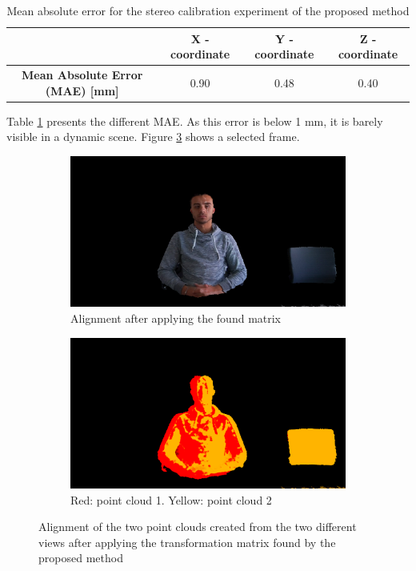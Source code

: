\begin{table}[H]
\begin{tabular}{c|c|c|c}
 & \textbf{X - coordinate} & \textbf{Y - coordinate} & \textbf{Z - coordinate} \\ \hline
\textbf{Mean Absolute Error (MAE) {[}mm{]}} & 0.90 & 0.48 & 0.40
\end{tabular}
\caption{Mean absolute error for the stereo calibration experiment of the proposed method}
\label{tab:mae_proposed_method}
\end{table}

Table \ref{tab:mae_proposed_method} presents the different MAE. As this error is below 1 mm, it is barely visible in a dynamic scene. Figure \ref{figure:proposed_method_alignment} shows a selected frame.


\begin{figure}[H]
\centering
  \begin{subfigure}[b]{0.48 \textwidth}
    \includegraphics[width=\textwidth]{images/registration/proposed_method_RGB.png}
    \caption{Alignment after applying the found matrix}
    \label{figure:stereo_RGB}
  \end{subfigure}
  \hfill
  \begin{subfigure}[b]{0.48\textwidth}
    \includegraphics[width=\textwidth]{images/registration/proposed_method_colour.png}
    \caption{Red: point cloud 1. Yellow: point cloud 2}
    \label{figure:stereo_colored}
  \end{subfigure}
  \caption{Alignment of the two point clouds created from the two different views after applying the transformation matrix found by the proposed method}
  \label{figure:proposed_method_alignment}
\end{figure}



